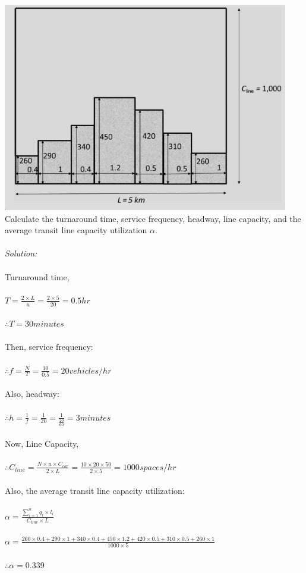 \includegraphics{gfx/fig30.png}\\
Calculate the turnaround time, service frequency, headway, line capacity, and the average transit line capacity utilization $\alpha$.\\\\
\textit{Solution:}\\\\
Turnaround time,\\\\
$ T = \frac{2 \times L}{u} = \frac{2 \times 5}{20} = 0.5 hr$\\\\
$ \therefore T = 30 minutes$\\\\
Then, service frequency:\\\\
$ \therefore f = \frac{N}{T} = \frac{10}{0.5} = 20 vehicles/hr$\\\\
Also, headway:\\\\
$ \therefore h = \frac{1}{f} = \frac{1}{20} = \frac{1}{\frac{20}{60}} = 3 minutes$\\\\
Now, Line Capacity,\\\\
$ \therefore C_{line} = \frac{N \times u \times C_{car}}{2 \times L} = \frac{10 \times 20 \times 50}{2 \times 5} = 1000 spaces/hr$\\\\
Also, the average transit line capacity utilization:\\\\
$ \alpha = \frac{\sum_{i = 1}^{n} q_i \times l_i}{C_{line} \times L} $\\\\
$ \alpha = \frac{260 \times 0.4 + 290 \times 1 + 340 \times 0.4 + 450 \times 1.2 + 420 \times 0.5 + 310 \times 0.5 + 260 \times 1}{1000 \times 5} $\\\\
$ \therefore \alpha = 0.339$
%
